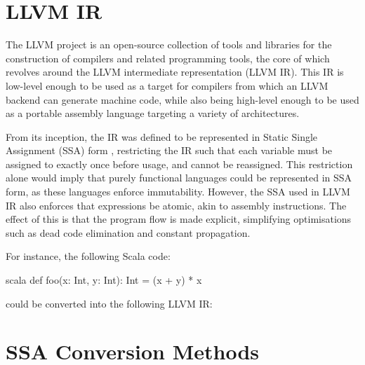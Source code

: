 
% 

\section{LLVM IR}

The LLVM project is an open-source collection of tools and libraries for the construction of
compilers and related programming tools, the core of which revolves around the LLVM intermediate
representation (LLVM IR). This IR is low-level enough to be used as a target for compilers from
which an LLVM backend can generate machine code, while also being high-level enough to be used as a
portable assembly language targeting a variety of architectures.

From its inception, the IR was defined to be represented in Static Single Assignment (SSA) form
\autocite{lattner2004llvm}, restricting the IR such that each variable must be assigned to exactly
once before usage, and cannot be reassigned. This restriction alone would imply that purely
functional languages could be represented in SSA form, as these languages enforce immutability.
However, the SSA used in LLVM IR also enforces that expressions be atomic, akin to assembly
instructions. The effect of this is that the program flow is made explicit, simplifying
optimisations such as dead code elimination and constant propagation.

For instance, the following Scala code:

\begin{code}{scala}
    def foo(x: Int, y: Int): Int = (x + y) * x
\end{code}

could be converted into the following LLVM IR:


\section{SSA Conversion Methods}

